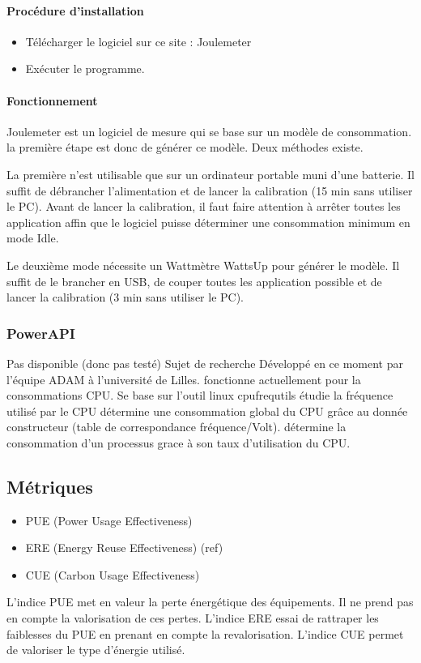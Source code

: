 \documentclass[a4paper, 11pt]{report}
\begin{document}
\paragraph{Procédure d'installation}
\begin{itemize}
	\item Télécharger le logiciel sur ce site : Joulemeter
	\item Exécuter le programme.
\end{itemize}

\paragraph{Fonctionnement}
Joulemeter est un logiciel de mesure qui se base sur un modèle de consommation. la première étape est donc de générer ce modèle. Deux méthodes existe.

La première n’est utilisable que sur un ordinateur portable muni d’une batterie. Il suffit de débrancher l’alimentation et de lancer la calibration (15 min sans utiliser le PC). Avant de lancer la calibration, il faut faire attention à arrêter toutes les application affin que le logiciel puisse déterminer une consommation minimum en mode Idle.

Le deuxième mode nécessite un Wattmètre WattsUp pour générer le modèle. Il suffit de le brancher en USB, de couper toutes les application possible et de lancer la calibration (3 min sans utiliser le PC).

\subsubsection{PowerAPI}
Pas disponible (donc pas testé)
Sujet de recherche
Développé en ce moment par l’équipe ADAM à l’université de Lilles.
fonctionne actuellement pour la consommations CPU.
Se base sur l’outil linux cpufrequtils
étudie la fréquence utilisé par le CPU
détermine une consommation global du CPU grâce au donnée constructeur (table de correspondance fréquence/Volt).
détermine la consommation d’un processus grace à son taux d’utilisation du CPU.
\subsection{Métriques}
\begin{itemize}
	\item PUE (Power Usage Effectiveness)
	\item ERE (Energy Reuse Effectiveness) (ref)
	\item CUE (Carbon Usage Effectiveness)
\end{itemize}
L’indice PUE met en valeur la perte énergétique des équipements. Il ne prend pas en compte la valorisation de ces pertes.
L’indice ERE essai de rattraper les faiblesses du PUE en prenant en compte la revalorisation.
L’indice CUE permet de valoriser le type d’énergie utilisé.
\end{document}
